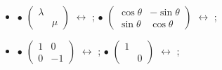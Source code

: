 \begin{frame}
\begin{example}
\begin{itemize}
\pp
\item[] $\bullet$  $\begin{pmatrix}\lambda&\\&\mu\end{pmatrix}$ $\leftrightarrow$ ;
\pp
\qquad $\bullet$  $\begin{pmatrix}\cos\theta&-\sin\theta\\\sin\theta&\cos\theta\end{pmatrix}$ $\leftrightarrow$ ;
\pp
\item[] $\bullet$  $\begin{pmatrix}1&0\\0&-1\end{pmatrix}$ $\leftrightarrow$ ;
\pp
\qquad $\bullet$  $\begin{pmatrix}1&\\&0\end{pmatrix}$ $\leftrightarrow$ ;
\end{itemize}
\end{example}
\end{frame}








